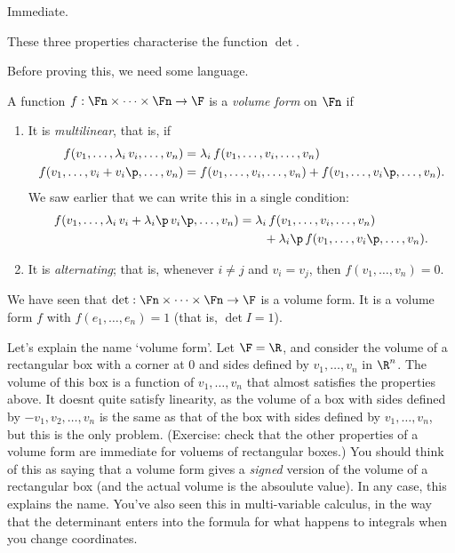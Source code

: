 \begin{proof*}
	Immediate. %
\end{proof*}

\begin{theorem}
	These three properties characterise the function  $\det$. %
\end{theorem}

Before proving this, we need some language.

\begin{definition}
	A function $f:\Fn\times\cdots\times\Fn\to\F$ is a \emph{volume form} on $\Fn$ if
	\begin{enumerate}
		\item It is \emph{multilinear}, that is, if
		\begin{align*}
			f(v_1,\ldots,\lambda_i\,v_i,\ldots,v_n)
			&= \lambda_i\,f(v_1,\ldots,v_i,\ldots,v_n) \\
			f(v_1,\ldots,v_i+v_i\p,\ldots,v_n)
			&= f(v_1,\ldots,v_i,\ldots,v_n)
			 + f(v_1,\ldots,v_i\p,\ldots,v_n).
		\end{align*}
		We saw earlier that we can write this in a single condition:
		\begin{align*}
			f(v_1,\ldots,\lambda_i\,v_i + \lambda_i\p\,v_i\p,\ldots,v_n)
			&= \lambda_i\,f(v_1,\ldots,v_i,\ldots,v_n) \\
			&\qquad + \lambda_i\p \, f(v_1,\ldots,v_i\p,\ldots,v_n). %
		\end{align*}
		
		\item It is \emph{alternating}; that is, whenever $i\neq j$ and $v_i=v_j$, then $f(v_1,\ldots,v_n)=0$. %
	\end{enumerate}
\end{definition}

\begin{example}
	We have seen that $\det:\Fn\times\cdots\times\Fn \to \F$ is a volume form. It is a volume form $f$ with $f(e_1,\ldots,e_n)=1$ (that is, $\det I=1$). %
\end{example}

\begin{remark} Let's explain the name `volume form'.
Let $\F = \R$, and consider the volume of a rectangular box with a corner at $0$ and sides defined by $v_1, \dots, v_n$ in $\R^n$. The volume of this box is a function of $v_1,\dots,v_n$ that almost satisfies the properties above. It doesnt quite satisfy linearity, as the volume of a box with sides defined by $-v_1,v_2,\dots,v_n$ is the same as that of the box with sides defined by $v_1, \dots, v_n$, but this is the only problem. (Exercise: check that the other properties of a volume form are immediate for voluems of rectangular boxes.)  You should think of this as saying that a volume form gives a \emph{signed} version of the volume of a rectangular box (and the actual volume is the absoulute value). In any case, this explains the name. You've also seen this in multi-variable calculus, in the way that the determinant enters into the formula for what happens to integrals when you change coordinates.
\end{remark}

